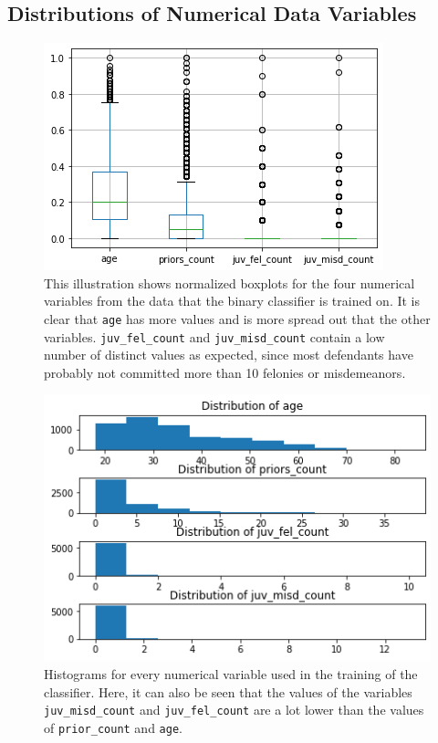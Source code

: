 \documentclass[11pt, fleqn, titlepage]{article}
\begin{document}
	\subsection{Distributions of Numerical Data Variables}
	\begin{figure}[H]
		\centering
		\includegraphics[width=0.5\linewidth]{imgs/boxplot_numericals}
		\caption{This illustration shows normalized boxplots for the four numerical variables from the data that the binary classifier is trained on. It is clear that \texttt{age} has more values and is more spread out that the other variables. \texttt{juv\_fel\_count} and \texttt{juv\_misd\_count} contain a low number of distinct values as expected, since most defendants have probably not committed more than 10 felonies or misdemeanors.}
		\label{fig:boxplotnumericals}
	\end{figure}
	\begin{figure}[H]
		\centering
		\includegraphics[width=0.5\linewidth]{imgs/histogram_numerical}
		\caption{Histograms for every numerical variable used in the training of the classifier. Here, it can also be seen that the values of the variables \texttt{juv\_misd\_count} and \texttt{juv\_fel\_count} are a lot lower than the values of \texttt{prior\_count} and \texttt{age}.}
		\label{fig:histogramnumerical}
	\end{figure}
	
\end{document}
